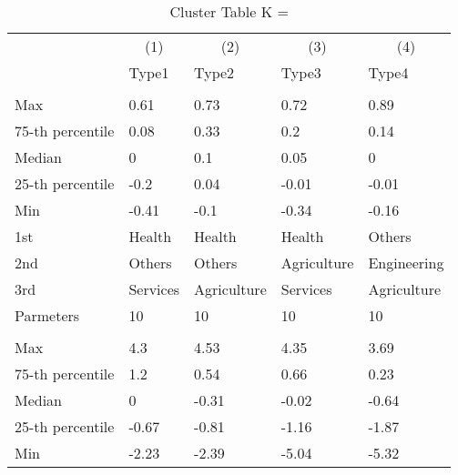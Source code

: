 \begin{table}
\centering
\caption{Cluster Table K = }
\centering
\begin{threeparttable}
\begin{tabular}[t]{lllll}
\toprule
\multicolumn{1}{c}{ } & \multicolumn{1}{c}{(1)} & \multicolumn{1}{c}{(2)} & \multicolumn{1}{c}{(3)} & \multicolumn{1}{c}{(4)} \\
\cmidrule(l{3pt}r{3pt}){2-2} \cmidrule(l{3pt}r{3pt}){3-3} \cmidrule(l{3pt}r{3pt}){4-4} \cmidrule(l{3pt}r{3pt}){5-5}
 & Type1 & Type2 & Type3 & Type4\\
\midrule
\addlinespace[0.3em]
\multicolumn{5}{l}{\textit{\textbf{Panel A: }}}\\
\hspace{1em}Max & 0.61 & 0.73 & 0.72 & 0.89\\
\hspace{1em}75-th percentile & 0.08 & 0.33 & 0.2 & 0.14\\
\hspace{1em}Median & 0 & 0.1 & 0.05 & 0\\
\hspace{1em}25-th percentile & -0.2 & 0.04 & -0.01 & -0.01\\
\hspace{1em}Min & -0.41 & -0.1 & -0.34 & -0.16\\
\hspace{1em}1st & Health & Health & Health & Others\\
\hspace{1em}2nd & Others & Others & Agriculture & Engineering\\
\hspace{1em}3rd & Services & Agriculture & Services & Agriculture\\
\hspace{1em}Parmeters & 10 & 10 & 10 & 10\\
\addlinespace[0.3em]
\multicolumn{5}{l}{\textit{\textbf{Panel B: }}}\\
\hspace{1em}Max & 4.3 & 4.53 & 4.35 & 3.69\\
\hspace{1em}75-th percentile & 1.2 & 0.54 & 0.66 & 0.23\\
\hspace{1em}Median & 0 & -0.31 & -0.02 & -0.64\\
\hspace{1em}25-th percentile & -0.67 & -0.81 & -1.16 & -1.87\\
\hspace{1em}Min & -2.23 & -2.39 & -5.04 & -5.32\\

\end{tabular}
\end{threeparttable}
\end{table}
